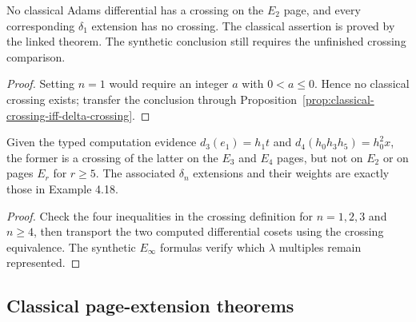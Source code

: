\begin{corollary}
  \label{cor:classical-e2-no-crossing}
  \notready
  No classical Adams differential has a crossing on the $E_2$ page, and every
  corresponding $\delta_1$ extension has no crossing.
  The classical assertion is proved by the linked theorem. The synthetic
  conclusion still requires the unfinished crossing comparison.
\end{corollary}

\begin{proof}
  Setting $n=1$ would require an integer $a$ with $0<a\le0$.  Hence no
  classical crossing exists; transfer the conclusion through
  Proposition~\ref{prop:classical-crossing-iff-delta-crossing}.
\end{proof}

\begin{proposition}
  \label{prop:stem38-crossing-regression}
  \notready
  Given the typed computation evidence
  $d_3(e_1)=h_1t$ and
  $d_4(h_0h_3h_5)=h_0^2x$, the former is a crossing of the latter on the
  $E_3$ and $E_4$ pages, but not on $E_2$ or on pages $E_r$ for $r\ge5$.
  The associated $\delta_n$ extensions and their weights are exactly those in
  Example 4.18.
\end{proposition}

\begin{proof}
  Check the four inequalities in the crossing definition for $n=1,2,3$ and
  $n\ge4$, then transport the two computed differential cosets using the
  crossing equivalence.  The synthetic $E_\infty$ formulas verify which
  $\lambda$ multiples remain represented.
\end{proof}

\subsection{Classical page-extension theorems}

